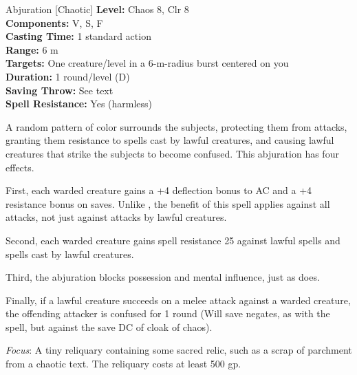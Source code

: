 {Abjuration [Chaotic]}
{
	\textbf{Level:}
	Chaos 8, Clr 8\\
	\textbf{Components:}
	V, S, F\\
	\textbf{Casting Time:}
	1 standard action\\
	\textbf{Range:}
	6 m\\
	\textbf{Targets:}
	One creature/level in a 6-m-radius burst centered on you\\
	\textbf{Duration:}
	1 round/level (D)\\
	\textbf{Saving Throw:}
	See text\\
	\textbf{Spell Resistance:}
	Yes (harmless)\\
}
{
	A random pattern of color surrounds the subjects, protecting them from attacks, granting them resistance to spells cast by lawful creatures, and causing lawful creatures that strike the subjects to become confused. This abjuration has four effects.

	First, each warded creature gains a +4 deflection bonus to AC and a +4 resistance bonus on saves. Unlike , the benefit of this spell applies against all attacks, not just against attacks by lawful creatures.

	Second, each warded creature gains spell resistance 25 against lawful spells and spells cast by lawful creatures.

	Third, the abjuration blocks possession and mental influence, just as  does.

	Finally, if a lawful creature succeeds on a melee attack against a warded creature, the offending attacker is confused for 1 round (Will save negates, as with the  spell, but against the save DC of cloak of chaos).

	\textit{Focus}:
	A tiny reliquary containing some sacred relic, such as a scrap of parchment from a chaotic text. The reliquary costs at least 500 gp.

}
